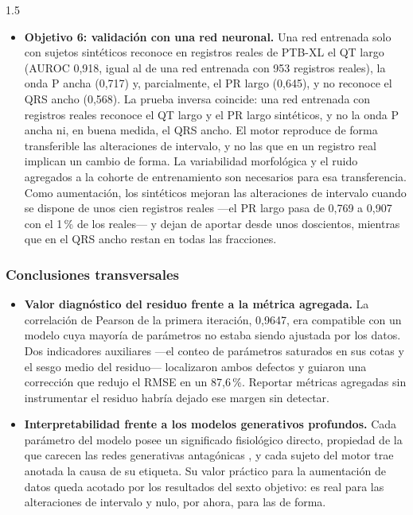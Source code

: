 \begin{spacing}{1.5}
\begin{itemize}
    \item \textbf{Objetivo 6: validación con una red neuronal.}
    Una red entrenada solo con sujetos sintéticos reconoce en registros reales de PTB-XL el QT largo (AUROC 0,918, igual al de una red entrenada con 953 registros reales), la onda P ancha (0,717) y, parcialmente, el PR largo (0,645), y no reconoce el QRS ancho (0,568). La prueba inversa coincide: una red entrenada con registros reales reconoce el QT largo y el PR largo sintéticos, y no la onda P ancha ni, en buena medida, el QRS ancho. El motor reproduce de forma transferible las alteraciones de intervalo, y no las que en un registro real implican un cambio de forma. La variabilidad morfológica y el ruido agregados a la cohorte de entrenamiento son necesarios para esa transferencia. Como aumentación, los sintéticos mejoran las alteraciones de intervalo cuando se dispone de unos cien registros reales ---el PR largo pasa de 0,769 a 0,907 con el 1\,\% de los reales--- y dejan de aportar desde unos doscientos, mientras que en el QRS ancho restan en todas las fracciones.
\end{itemize}

\subsubsection{Conclusiones transversales}

\begin{itemize}
    \item \textbf{Valor diagnóstico del residuo frente a la métrica agregada.} La correlación de Pearson de la primera iteración, 0,9647, era compatible con un modelo cuya mayoría de parámetros no estaba siendo ajustada por los datos. Dos indicadores auxiliares ---el conteo de parámetros saturados en sus cotas y el sesgo medio del residuo--- localizaron ambos defectos y guiaron una corrección que redujo el RMSE en un 87,6\,\%. Reportar métricas agregadas sin instrumentar el residuo habría dejado ese margen sin detectar.

    \item \textbf{Interpretabilidad frente a los modelos generativos profundos.} Cada parámetro del modelo posee un significado fisiológico directo, propiedad de la que carecen las redes generativas antagónicas \cite{brophy2023generative}, y cada sujeto del motor trae anotada la causa de su etiqueta. Su valor práctico para la aumentación de datos queda acotado por los resultados del sexto objetivo: es real para las alteraciones de intervalo y nulo, por ahora, para las de forma.
\end{itemize}


\end{spacing}
